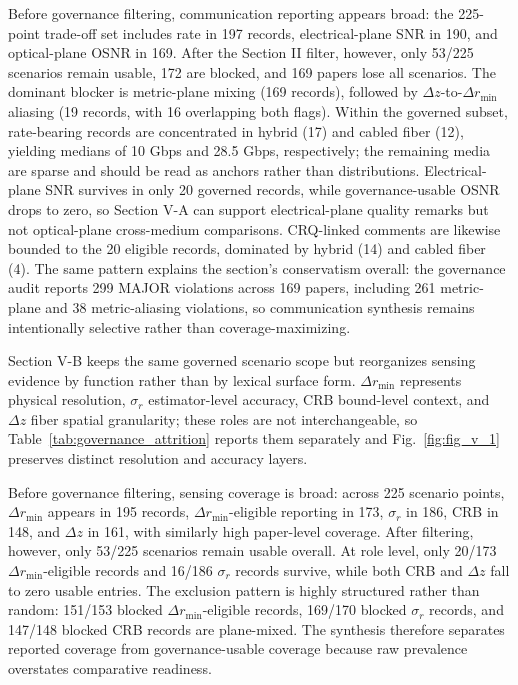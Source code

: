 \documentclass[letterpaper,journal]{IEEEtran}
\begin{document}
Before governance filtering, communication reporting appears broad: the 225-point trade-off set includes rate in 197 records, electrical-plane SNR in 190, and optical-plane OSNR in 169. After the Section II filter, however, only 53/225 scenarios remain usable, 172 are blocked, and 169 papers lose all scenarios. The dominant blocker is metric-plane mixing (169 records), followed by $\Delta z$-to-$\Delta r_{\min}$ aliasing (19 records, with 16 overlapping both flags). Within the governed subset, rate-bearing records are concentrated in hybrid (17) and cabled fiber (12), yielding medians of 10 Gbps and 28.5 Gbps, respectively; the remaining media are sparse and should be read as anchors rather than distributions. Electrical-plane SNR survives in only 20 governed records, while governance-usable OSNR drops to zero, so Section V-A can support electrical-plane quality remarks but not optical-plane cross-medium comparisons. CRQ-linked comments are likewise bounded to the 20 eligible records, dominated by hybrid (14) and cabled fiber (4). The same pattern explains the section's conservatism overall: the governance audit reports 299 MAJOR violations across 169 papers, including 261 metric-plane and 38 metric-aliasing violations, so communication synthesis remains intentionally selective rather than coverage-maximizing.

Section V-B keeps the same governed scenario scope but reorganizes sensing evidence by function rather than by lexical surface form. $\Delta r_{\min}$ represents physical resolution, $\sigma_r$ estimator-level accuracy, CRB bound-level context, and $\Delta z$ fiber spatial granularity; these roles are not interchangeable, so Table~\ref{tab:governance_attrition} reports them separately and Fig.~\ref{fig:fig_v_1} preserves distinct resolution and accuracy layers.

Before governance filtering, sensing coverage is broad: across 225 scenario points, $\Delta r_{\min}$ appears in 195 records, $\Delta r_{\min}$-eligible reporting in 173, $\sigma_r$ in 186, CRB in 148, and $\Delta z$ in 161, with similarly high paper-level coverage. After filtering, however, only 53/225 scenarios remain usable overall. At role level, only 20/173 $\Delta r_{\min}$-eligible records and 16/186 $\sigma_r$ records survive, while both CRB and $\Delta z$ fall to zero usable entries. The exclusion pattern is highly structured rather than random: 151/153 blocked $\Delta r_{\min}$-eligible records, 169/170 blocked $\sigma_r$ records, and 147/148 blocked CRB records are plane-mixed. The synthesis therefore separates reported coverage from governance-usable coverage because raw prevalence overstates comparative readiness.
\end{document}
